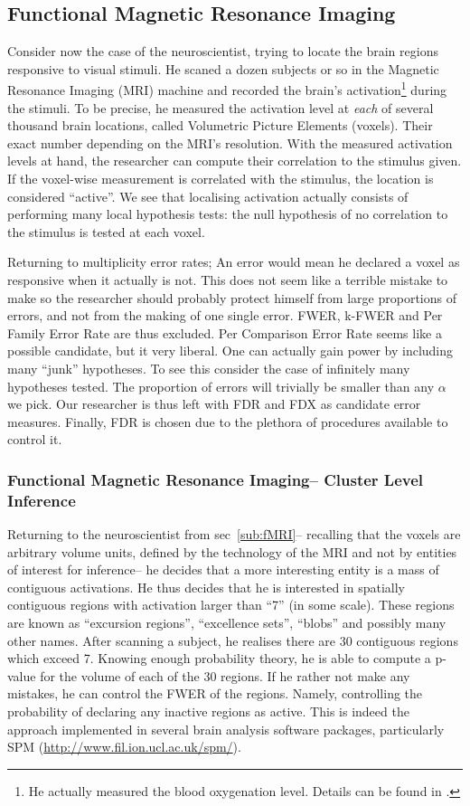 \documentclass[review,12pt]{article}
\begin{document}
\subsection{\label{sub:fMRI}Functional Magnetic Resonance Imaging}

Consider now the case of the neuroscientist, trying to locate the brain regions responsive to visual stimuli. He scaned a dozen subjects or so in the Magnetic Resonance Imaging (MRI) machine and recorded the brain's activation\footnote{ He actually measured the blood oxygenation level. Details can be found in \cite{lazar_statistical_2008}.} during the stimuli. To be precise, he measured the activation level at \emph{each} of several thousand brain locations, called Volumetric Picture Elements (voxels). Their exact number depending on the MRI's resolution. With the measured activation levels at hand, the researcher can compute their correlation to the stimulus given. If the voxel-wise measurement is correlated with the stimulus, the location is considered ``active''. We see that localising activation actually consists of performing many local hypothesis tests: the null hypothesis of no correlation to the stimulus is tested at each voxel.

Returning to multiplicity error rates; An error would mean he declared a voxel as responsive when it actually is not. This does not seem like a terrible mistake to make so the researcher should probably protect himself from large proportions of errors, and not from the making of one single error. FWER, k-FWER and Per Family Error Rate are thus excluded. Per Comparison Error Rate seems like a possible candidate, but it very liberal. One can actually gain power by including many ``junk'' hypotheses. To see this consider the case of infinitely many hypotheses tested. The proportion of errors will trivially be smaller than any $\alpha$ we pick. Our researcher is thus left with FDR and FDX as candidate error measures. Finally, FDR is chosen due to the plethora of procedures available to control it. 


\subsubsection{Functional Magnetic Resonance Imaging-- Cluster Level Inference}
Returning to the neuroscientist from sec~\ref{sub:fMRI}-- recalling that the voxels are arbitrary volume units, defined by the technology of the MRI and not by entities of interest for inference-- he decides that a more interesting entity is a mass of contiguous activations. He thus decides that he is interested in spatially contiguous regions with activation larger than ``7'' (in some scale). These regions are known as ``excursion regions'', ``excellence sets'', ``blobs'' and possibly many other names. 
After scanning a subject, he realises there are 30 contiguous regions which exceed 7. Knowing enough probability theory, he is able to compute a p-value for the volume of each of the 30 regions. If he rather not make any mistakes, he can control the FWER of the regions. Namely, controlling the probability of declaring any inactive regions as active. This is indeed the approach implemented in several brain analysis software packages, particularly SPM (\url{http://www.fil.ion.ucl.ac.uk/spm/}).
\end{document}
